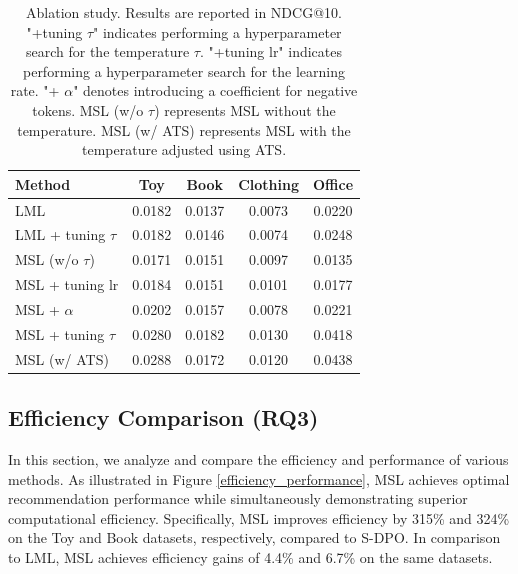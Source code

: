 \documentclass[sigconf,natbib=true]{acmart}
\begin{document}
\begin{table}[]
\centering
\caption{Ablation study. Results are reported in NDCG@10. "+tuning \(\tau\)" indicates performing a hyperparameter search for the temperature \(\tau\). "+tuning lr" indicates performing a hyperparameter search for the learning rate. "+ \(\alpha\)" denotes introducing a coefficient for negative tokens. MSL (w/o \(\tau\)) represents MSL without the temperature. MSL (w/ ATS) represents MSL with the temperature adjusted using ATS.}
\label{tab:ablation_study}
\begin{tabular}{@{}l|cccc@{}}
\toprule
Method                & Toy    & Book   & Clothing & Office \\ \midrule
LML                   & 0.0182 & 0.0137 & 0.0073   & 0.0220 \\
LML + tuning   $\tau$   & 0.0182 & 0.0146 & 0.0074   & 0.0248 \\
MSL (w/o $\tau$)      & 0.0171 & 0.0151 & 0.0097   & 0.0135 \\
MSL + tuning lr         & 0.0184 & 0.0151 & 0.0101   & 0.0177 \\
MSL + $\alpha$ & 0.0202 & 0.0157 & 0.0078   & 0.0221 \\
MSL + tuning $\tau$   & 0.0280 & 0.0182 & 0.0130   & 0.0418 \\
MSL (w/ ATS)          & 0.0288 & 0.0172 & 0.0120   & 0.0438 \\ \bottomrule
\end{tabular}
\end{table}







\subsection{Efficiency Comparison (RQ3)}
\label{efficiency}
In this section, we analyze and compare the efficiency and performance of various methods. As illustrated in Figure \ref{efficiency_performance}, MSL achieves optimal recommendation performance while simultaneously demonstrating superior computational efficiency. Specifically, MSL improves efficiency by 315\% and 324\% on the Toy and Book datasets, respectively, compared to S-DPO. In comparison to LML, MSL achieves efficiency gains of 4.4\% and 6.7\% on the same datasets.
\end{document}
